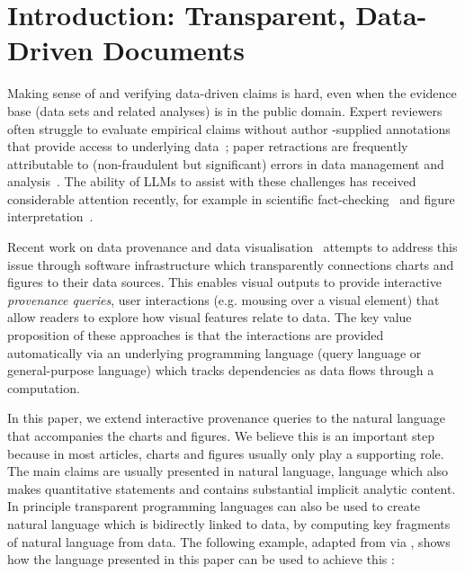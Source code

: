 \section{Introduction: Transparent, Data-Driven Documents}

Making sense of and verifying data-driven claims is hard, even when the evidence base (data sets and related
analyses) is in the public domain. Expert reviewers often struggle to evaluate empirical claims without author
-supplied annotations that provide access to underlying data~\citep{weber20}; paper retractions are frequently
attributable to (non-fraudulent but significant) errors in data management and analysis~\citep{hu25}. The
ability of LLMs to assist with these challenges has received considerable attention recently, for example in
scientific fact-checking~\citep{abu-ahmad25} and figure interpretation~\citep{roberts24}.

Recent work on data provenance and data visualisation~\citep{psallidas18smoke,perera22,bond25} attempts to
address this issue through software infrastructure which transparently connections charts and figures to their
data sources.  This enables visual outputs
to provide interactive \emph{provenance queries}, user interactions (e.g. mousing over a visual element) that
allow readers to explore how visual features relate to data. The key value proposition of these approaches is
that the interactions are provided automatically via an underlying programming language (query language or
general-purpose language) which tracks dependencies as data flows through a computation.

In this paper, we extend interactive provenance queries to the natural language that accompanies the charts
and figures. We believe this is an important step because in most articles, charts and figures usually only
play a supporting role. The main claims are usually presented in natural language, language which also makes
quantitative statements and contains substantial implicit analytic content. In principle transparent
programming languages can also be used to create natural language which is bidirectly linked to data, by
computing key fragments of natural language from data. The following example, adapted from \cite{zhang18} via
\cite{moosavi21}, shows how the language presented in this paper can be used to achieve this :

